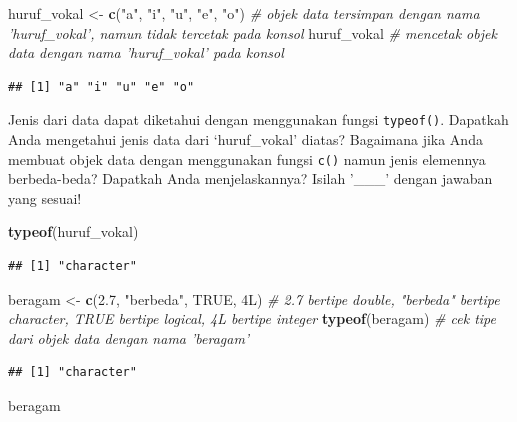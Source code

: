 \documentclass[]{article}
\newenvironment{Shaded}{\begin{snugshade}}{\end{snugshade}}
\newcommand{\CommentTok}[1]{\textcolor[rgb]{0.56,0.35,0.01}{\textit{#1}}}
\newcommand{\FloatTok}[1]{\textcolor[rgb]{0.00,0.00,0.81}{#1}}
\newcommand{\KeywordTok}[1]{\textcolor[rgb]{0.13,0.29,0.53}{\textbf{#1}}}
\newcommand{\NormalTok}[1]{#1}
\newcommand{\OtherTok}[1]{\textcolor[rgb]{0.56,0.35,0.01}{#1}}
\newcommand{\StringTok}[1]{\textcolor[rgb]{0.31,0.60,0.02}{#1}}
\begin{document}
\begin{Shaded}
\begin{Highlighting}[]
\NormalTok{huruf_vokal <-}\StringTok{ }\KeywordTok{c}\NormalTok{(}\StringTok{"a"}\NormalTok{, }\StringTok{"i"}\NormalTok{, }\StringTok{"u"}\NormalTok{, }\StringTok{"e"}\NormalTok{, }\StringTok{"o"}\NormalTok{) }\CommentTok{# objek data tersimpan dengan nama 'huruf_vokal', namun tidak tercetak pada konsol}
\NormalTok{huruf_vokal }\CommentTok{# mencetak objek data dengan nama 'huruf_vokal' pada konsol}
\end{Highlighting}
\end{Shaded}

\begin{verbatim}
## [1] "a" "i" "u" "e" "o"
\end{verbatim}

Jenis dari data dapat diketahui dengan menggunakan fungsi
\texttt{typeof()}. Dapatkah Anda mengetahui jenis data dari
`huruf\_vokal' diatas? Bagaimana jika Anda membuat objek data dengan
menggunakan fungsi \texttt{c()} namun jenis elemennya berbeda-beda?
Dapatkah Anda menjelaskannya? Isilah '\_\_\_' dengan jawaban yang
sesuai!

\begin{Shaded}
\begin{Highlighting}[]
\KeywordTok{typeof}\NormalTok{(huruf_vokal)}
\end{Highlighting}
\end{Shaded}

\begin{verbatim}
## [1] "character"
\end{verbatim}

\begin{Shaded}
\begin{Highlighting}[]
\NormalTok{beragam <-}\StringTok{ }\KeywordTok{c}\NormalTok{(}\FloatTok{2.7}\NormalTok{, }\StringTok{"berbeda"}\NormalTok{, }\OtherTok{TRUE}\NormalTok{, 4L) }\CommentTok{# 2.7 bertipe double, "berbeda" bertipe character, TRUE bertipe logical, 4L bertipe integer}
\KeywordTok{typeof}\NormalTok{(beragam) }\CommentTok{# cek tipe dari objek data dengan nama 'beragam'}
\end{Highlighting}
\end{Shaded}

\begin{verbatim}
## [1] "character"
\end{verbatim}

\begin{Shaded}
\begin{Highlighting}[]
\NormalTok{beragam}
\end{Highlighting}
\end{Shaded}
\end{document}
